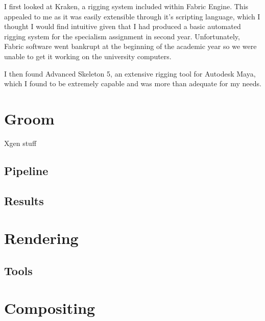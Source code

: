 \documentclass[11pt]{article}
\begin{document}
I first looked at Kraken\cite{kraken}, a rigging system included within Fabric Engine. This appealed to me as it was easily extensible through it's scripting language, which I thought I would find intuitive given that I had produced a basic automated rigging system for the specialism assignment in second year. Unfortunately, Fabric software went bankrupt at the beginning of the academic year so we were unable to get it working on the university computers.

I then found Advanced Skeleton 5\cite{advancedSkeleton}, an extensive rigging tool for Autodesk Maya, which I found to be extremely capable and was more than adequate for my needs.

\section{Groom}

Xgen stuff

\subsection{Pipeline}
\subsection{Results}

\section{Rendering}
\subsection{Tools}

\section{Compositing}



\end{document}
